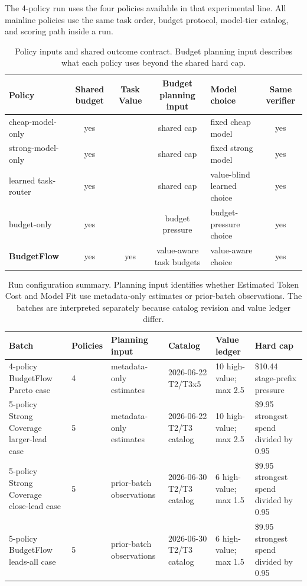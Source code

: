 \documentclass{article}
\newcommand{\method}{BudgetFlow\xspace}
\newcommand{\tokencost}{Estimated Token Cost\xspace}
\newcommand{\modelfit}{Model Fit\xspace}
\begin{document}
The 4-policy run uses the four policies available in that experimental line. All mainline policies use the same task order, budget protocol, model-tier catalog, and scoring path inside a run.

\begin{table}[t]
\centering
\small
\begin{tabular}{lccclc}
\toprule
Policy & Shared budget & \textbf{Task Value} & Budget planning input & Model choice & Same verifier \\
\midrule
cheap-model-only & yes &  & shared cap & fixed cheap model & yes \\
strong-model-only & yes &  & shared cap & fixed strong model & yes \\
learned task-router & yes &  & shared cap & value-blind learned choice & yes \\
budget-only & yes &  & budget pressure & budget-pressure choice & yes \\
\textbf{\method} & yes & yes & value-aware task budgets & value-aware choice & yes \\
\bottomrule
\end{tabular}
\caption{Policy inputs and shared outcome contract. Budget planning input describes what each policy uses beyond the shared hard cap.}
\label{tab:policies}
\end{table}

\begin{table}[t]
\centering
\scriptsize
\setlength{\tabcolsep}{3pt}
\begin{tabular}{@{}p{}p{}p{}p{}p{}p{}@{}}
\toprule
Batch & Policies & Planning input & Catalog & Value ledger & Hard cap \\
\midrule
4-policy BudgetFlow Pareto case & 4 & metadata-only estimates & 2026-06-22 T2/T3x5 & 10 high-value; max 2.5 & \$10.44 stage-prefix pressure \\
5-policy Strong Coverage larger-lead case & 5 & metadata-only estimates & 2026-06-22 T2/T3 catalog & 10 high-value; max 2.5 & \$9.95 strongest spend divided by 0.95 \\
5-policy Strong Coverage close-lead case & 5 & prior-batch observations & 2026-06-30 T2/T3 catalog & 6 high-value; max 1.5 & \$9.95 strongest spend divided by 0.95 \\
5-policy BudgetFlow leads-all case & 5 & prior-batch observations & 2026-06-30 T2/T3 catalog & 6 high-value; max 1.5 & \$9.95 strongest spend divided by 0.95 \\
\bottomrule
\end{tabular}
\caption{Run configuration summary. Planning input identifies whether \tokencost and \modelfit use metadata-only estimates or prior-batch observations. The batches are interpreted separately because catalog revision and value ledger differ.}
\label{tab:run-config}
\end{table}
\end{document}
